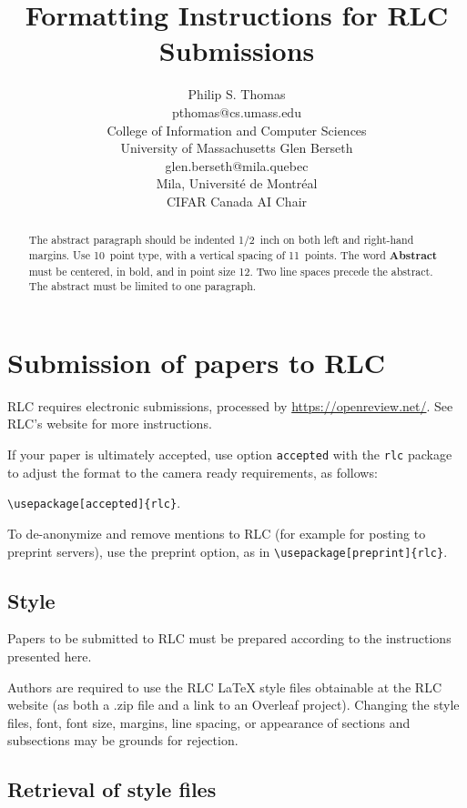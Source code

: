 \documentclass[10pt]{article} %
\title{Formatting Instructions for RLC Submissions}
\author{Philip S. Thomas  \\
    pthomas@cs.umass.edu \\
    College of Information and Computer Sciences\\
    University of Massachusetts
    \And
    Glen Berseth \\
    glen.berseth@mila.quebec\\
    Mila, Universit\'e de Montr\'eal \\
    CIFAR Canada AI Chair}
\begin{document}
\maketitle

\begin{abstract}
The abstract paragraph should be indented 1/2~inch on both left and right-hand margins. Use 10~point type, with a vertical spacing of 11~points. The word \textbf{\large Abstract} must be centered, in bold, and in point size 12. Two line spaces precede the abstract. The abstract must be limited to one paragraph.
\end{abstract}

\section{Submission of papers to RLC}
\label{sec:submission}

RLC requires electronic submissions, processed by \url{https://openreview.net/}. See RLC's website for more instructions.

If your paper is ultimately accepted, use option {\tt accepted} with the {\tt rlc} package to adjust the format to the camera ready requirements, as follows:
\begin{center}  
    {\tt {\textbackslash}usepackage[accepted]\{rlc\}}. 
\end{center}
To de-anonymize and remove mentions to RLC (for example for posting to preprint servers), use the preprint option, as in {\tt {\textbackslash}usepackage[preprint]\{rlc\}}. 

\subsection{Style}
Papers to be submitted to RLC must be prepared according to the instructions presented here.

Authors are required to use the RLC \LaTeX{} style files obtainable at the RLC website (as both a .zip file and a link to an Overleaf project). 
Changing the style files, font, font size, margins, line spacing, or appearance of sections and subsections may be grounds for rejection.

\subsection{Retrieval of style files}
\end{document}
